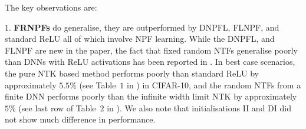 The key observations are:

$1.$ \textbf{FRNPFs}  do generalise, they are outperformed by DNPFL, FLNPF, and standard ReLU all of which involve NPF learning. While the DNPFL, and FLNPF are new in the paper, the fact that fixed random NTFs generalise poorly than DNNs with  ReLU activations has been reported in \cite{arora2019exact}. In best case scenarios, the pure NTK based method performs poorly than standard ReLU by approximately $5.5\%$ (see Table~$1$ in \cite{arora2019exact}) in CIFAR-10, and the random NTFs from a finite DNN performs poorly than the infinite width limit NTK by approximately $5\%$ (see last row of Table~$2$ in \cite{arora2019exact}). We also note that initialisations II and DI did not show much difference in performance.

